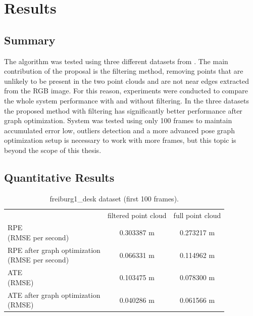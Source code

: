 \section{Results}
\subsection{Summary}

     The algorithm was tested using three different datasets from \cite{sturm12iros}. The main contribution of the 
proposal is the filtering method, removing points that are unlikely to be present in the two point clouds and are not 
near edges extracted from the RGB image. For this reason, experiments were conducted to compare the whole system performance 
with and without filtering. In the three datasets the proposed method with filtering has significantly better performance after 
graph optimization. System was tested using only 100 frames to maintain accumulated error low, outliers detection and a more advanced  
pose graph optimization setup is necessary to work with more frames, but this topic is beyond the scope of this thesis.

\subsection{Quantitative Results}
\begin{center}
\begin{table}[H]
\begin{tabular}{ |l|c|c|}
\hline & filtered point cloud & full point cloud \\
\pbox{20cm}{RPE \\ (RMSE per second)} & 0.303387 m & 0.273217 m \\
\hline
\pbox{20cm} {RPE after graph optimization \\ (RMSE per second)} &  0.066331 m &  0.114962 m\\
\hline
\pbox{20cm}{ATE \\ (RMSE)} & 0.103475 m & 0.078300 m\\
\hline
\pbox{20cm} {ATE after graph optimization \\ (RMSE)} & 0.040286 m & 0.061566 m\\
\hline
\end{tabular}
\caption{freiburg1\_desk dataset (first 100 frames).}
\label{table:quantfd1}
\end{table}
\end{center}


